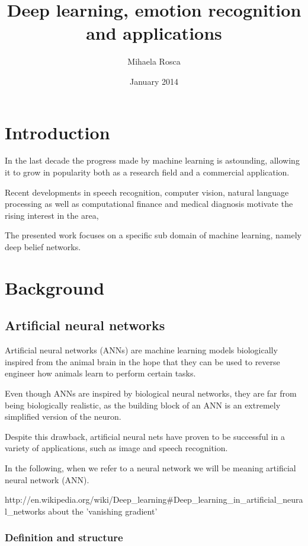 \documentclass[11pt, fleqn, twoside]{article}
\title{Deep learning, emotion recognition and applications}
\author{Mihaela Rosca}
\date{January 2014}
\begin{document}
\maketitle
\tableofcontents
\listoffigures

\section{Introduction}
  In the last decade the progress made by machine learning is astounding, allowing it to grow in popularity both as a research field  and a commercial application.

  Recent developments in speech recognition, computer vision, natural language processing as well as computational finance and medical diagnosis motivate the rising interest in the area,

  The presented work focuses on a specific sub domain of machine learning, namely deep belief networks.




\section{Background}


\subsection{Artificial neural networks}

  Artificial neural networks (ANNs) are machine learning models biologically inspired from the animal brain in the hope that they can be used to reverse engineer how animals learn to perform certain tasks.

  Even though ANNs are inspired by biological neural networks, they are far from being biologically realistic, as the building block of an ANN is an extremely simplified version of the neuron.

  Despite this drawback, artificial neural nets have proven to be successful in a variety of applications, such as image and speech recognition.

  In the following, when we refer to a neural network we will be meaning artificial neural network (ANN).

  http://en.wikipedia.org/wiki/Deep_learning#Deep_learning_in_artificial_neural_networks
  about the 'vanishing gradient'

\subsubsection {Definition and structure}
\end{document}
